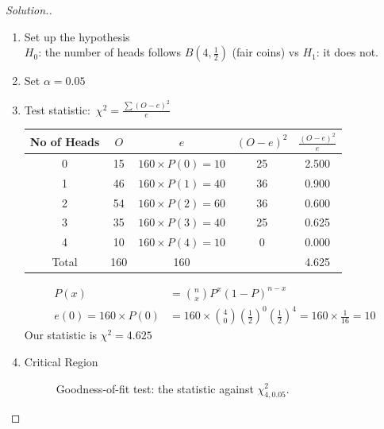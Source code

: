 \documentclass[11pt,a4paper]{article}
\theoremstyle{definition}
\newenvironment{solution}
  {\renewcommand{\qedsymbol}{}\begin{proof}[\textit{Solution}.]}
  {\end{proof}}
\begin{document}
\begin{solution}
\begin{enumerate}
\item Set up the hypothesis\\[1ex]
$H_0$: the number of heads follows $B(4, \frac12)$ (fair coins) vs $H_1$: it does not.
\item Set $\alpha =0.05$
\item Test statistic:\ 
$\chi^2=\frac{\sum (O-e)^2}{e}$


\begin{table}[H]
\centering
\begin{tabular}{|c|c|c|c|c|}
\hline No of Heads & $O$ &$e$& $(O-e)^2$ &$\frac{(O-e)^2}{e}$\\
\hline 0&15& $160\times P(0)=10$ & 25 & 2.500\\
1&46& $160\times P(1)=40$ & 36 & 0.900\\
2&54& $160\times P(2)=60$ & 36 & 0.600\\
3&35& $160\times P(3)=40$ & 25 & 0.625\\
4&10& $160\times P(4)=10$ &  0 & 0.000\\
\hline Total & 160 & 160 & & 4.625\\
\hline
\end{tabular}
\end{table}

\begin{align*}
P(x) &=\binom{n}{x}P^x(1-P)^{n-x}\\[1ex]
e(0)=160\times P(0) &=160\times \binom{4}{0}
\left(\frac{1}{2}\right)^0\left(\frac{1}{2}\right)^4=160\times \frac{1}{16}=10
\end{align*}
Our statistic is $\chi^2=4.625$\\


\item Critical Region




\begin{figure}[H]
\centering
{}
\caption{Goodness-of-fit test: the statistic against $\chi^2_{4,0.05}$.}
\end{figure}



















\end{enumerate}
\end{solution}
\end{document}
